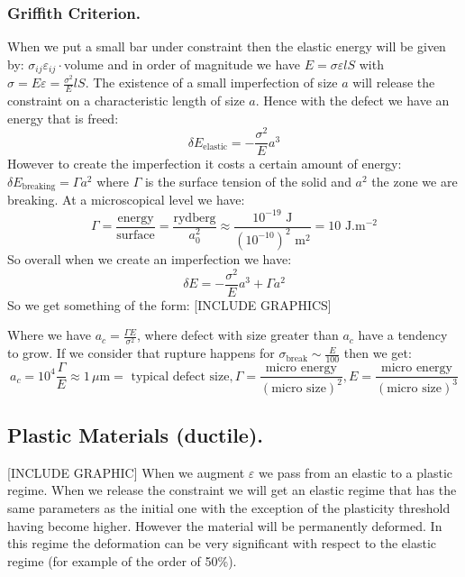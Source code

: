\documentclass[10pt,a4paper]{book}
\begin{document}
\subsubsection{Griffith Criterion.}
When we put a small bar under constraint then the elastic energy will be given by: $\sigma_{ij} \varepsilon_{ij} \cdot \text{volume}$ and in order of magnitude we have $E = \sigma \varepsilon l S$ with $\sigma = E \varepsilon = \frac{\sigma^2}{E} l S$. The existence of a small imperfection of size $a$ will release the constraint on a characteristic length of size $a$. Hence with the defect we have an energy that is freed:
\[
\delta E_\text{elastic} = - \frac{\sigma^2}{E} a^3
\]
However to create the imperfection it costs a certain amount of energy: $\delta E_\text{breaking} = \Gamma a^2$ where $\Gamma$ is the surface tension of the solid and $a^2$ the zone we are breaking. At a microscopical level we have:
\[
\Gamma = \frac{\text{energy}}{\text{surface}} = \frac{\text{rydberg}}{a_0^2} \approx \frac{10^{-19} \text{ J}}{(10^{-10})^2 \text{ m}^2} = 10 \text{ J}.\text{m}^{-2}
\]
So overall when we create an imperfection we have:
\[
\delta E = - \frac{\sigma^2}{E} a^3 + \Gamma a^2
\]
So we get something of the form:
[INCLUDE GRAPHICS]

Where we have $a_c = \frac{\Gamma E}{\sigma^2}$, where defect with size greater than $a_c$ have a tendency to grow. If we consider that rupture happens for $\sigma_\text{break} \sim \frac{E}{100}$ then we get:
\[
a_c = 10^4 \frac{\Gamma}{E} \approx 1 \, \mu\text{m} = \text{ typical defect size}, \Gamma = \frac{\text{micro energy}}{(\text{micro size})^2}, E = \frac{\text{micro energy}}{(\text{micro size})^3}
\]

\subsection{Plastic Materials (ductile).}
[INCLUDE GRAPHIC]
When we augment $\varepsilon$ we pass from an elastic to a plastic regime. When we release the constraint we will get an elastic regime that has the same parameters as the initial one with the exception of the plasticity threshold having become higher. However the material will be permanently deformed. In this regime the deformation can be very significant with respect to the elastic regime (for example of the order of 50\%).
\end{document}
